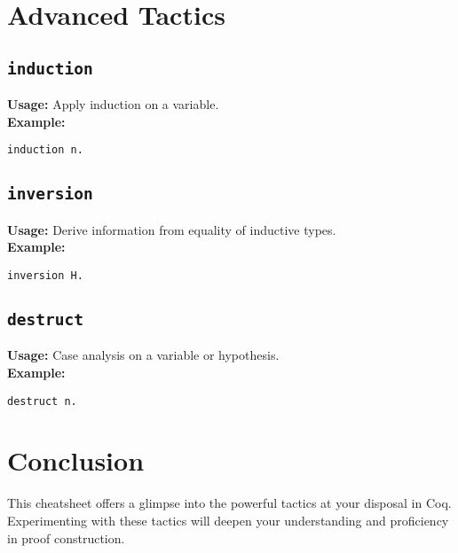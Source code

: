 \documentclass{article}
\begin{document}
\section{Advanced Tactics}
\subsection{\texttt{induction}}
\textbf{Usage:} Apply induction on a variable. \\
\textbf{Example:}
\begin{lstlisting}[language=Coq]
induction n.
\end{lstlisting}

\subsection{\texttt{inversion}}
\textbf{Usage:} Derive information from equality of inductive types. \\
\textbf{Example:}
\begin{lstlisting}[language=Coq]
inversion H.
\end{lstlisting}

\subsection{\texttt{destruct}}
\textbf{Usage:} Case analysis on a variable or hypothesis. \\
\textbf{Example:}
\begin{lstlisting}[language=Coq]
destruct n.
\end{lstlisting}

\section{Conclusion}
This cheatsheet offers a glimpse into the powerful tactics at your disposal in Coq. Experimenting with these tactics will deepen your understanding and proficiency in proof construction.
\end{document}
